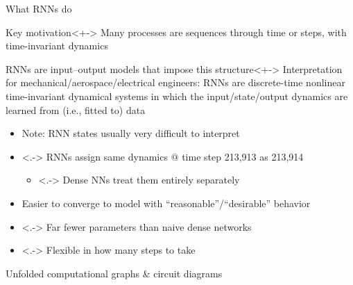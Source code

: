 \begin{frame}{What RNNs do}
    \begin{block}{Key motivation}<+->
        Many processes are sequences through \alert{time} or \alert{steps}, with \alert{time-invariant dynamics}
    \end{block}

    \begin{block}{RNNs are input--output models that impose this structure}<+->
        Interpretation for mechanical/aerospace/electrical engineers: RNNs are \alert{discrete-time nonlinear time-invariant dynamical systems} in which the input/state/output dynamics are learned from (i.e., fitted to) data
    \end{block}

    \begin{itemize}
        \item<+-> Note: RNN states usually very difficult to interpret
        \item<.-> RNNs assign same dynamics @ time step 213,913 as 213,914
        \begin{itemize}
            \item<.-> Dense NNs treat them entirely separately
        \end{itemize}
        \item<+-> Easier to converge to model with ``reasonable''/``desirable'' behavior
        \item<.-> Far fewer parameters than naive dense networks
        \item<.-> Flexible in how many steps to take
    \end{itemize}
\end{frame}

\begin{frame}{Unfolded computational graphs \& circuit diagrams}
    
\end{frame}

